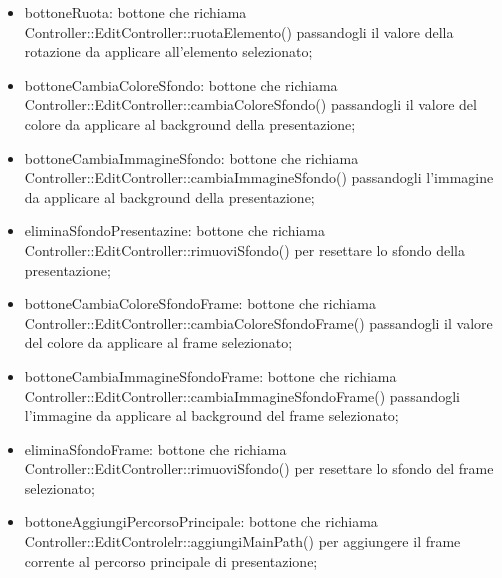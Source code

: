 {{\begin{itemize}
		\item bottoneRuota: bottone che richiama Controller::EditController::ruotaElemento() passandogli il valore della rotazione da applicare all'elemento selezionato;
		\item bottoneCambiaColoreSfondo: bottone che richiama Controller::EditController::cambiaColoreSfondo() passandogli il valore del colore da applicare al background della presentazione;
		\item bottoneCambiaImmagineSfondo: bottone che richiama Controller::EditController::cambiaImmagineSfondo() passandogli l'immagine da applicare al background della presentazione;
		\item eliminaSfondoPresentazine: bottone che richiama Controller::EditController::rimuoviSfondo() per resettare lo sfondo della presentazione;
		\item bottoneCambiaColoreSfondoFrame: bottone che richiama Controller::EditController::cambiaColoreSfondoFrame() passandogli il valore del colore da applicare al frame selezionato;
		\item bottoneCambiaImmagineSfondoFrame: bottone che richiama Controller::EditController::cambiaImmagineSfondoFrame() passandogli l'immagine da applicare al background del frame selezionato;
		\item eliminaSfondoFrame: bottone che richiama Controller::EditController::rimuoviSfondo() per resettare lo sfondo del frame selezionato;
		\item bottoneAggiungiPercorsoPrincipale: bottone che richiama Controller::EditControlelr::aggiungiMainPath() per aggiungere il frame corrente al percorso principale di presentazione;


\end{itemize}}}
